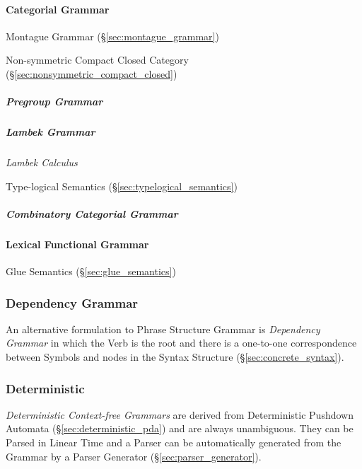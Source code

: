 \paragraph{Categorial Grammar}\label{sec:categorial_grammar}\hfill

Montague Grammar (\S\ref{sec:montague_grammar})

Non-symmetric Compact Closed Category
(\S\ref{sec:nonsymmetric_compact_closed})



\subparagraph{Pregroup Grammar}\label{sec:pregroup_grammar}\hfill

\subparagraph{Lambek Grammar}\label{sec:lambek_grammar}\hfill

\emph{Lambek Calculus}

Type-logical Semantics (\S\ref{sec:typelogical_semantics})


\subparagraph{Combinatory Categorial Grammar}\hfill
\label{sec:combinatory_categorial}



\paragraph{Lexical Functional Grammar}\label{sec:lexical_functional}
\hfill

Glue Semantics (\S\ref{sec:glue_semantics})



\subsubsection{Dependency Grammar}\label{sec:dependency_grammar}

An alternative formulation to Phrase Structure Grammar is
\emph{Dependency Grammar} in which the Verb is the root and there is a
one-to-one correspondence between Symbols and nodes in the Syntax
Structure (\S\ref{sec:concrete_syntax}).



\subsubsection{Deterministic}\label{sec:deterministic_cfg}

\emph{Deterministic Context-free Grammars} are derived from
Deterministic Pushdown Automata (\S\ref{sec:deterministic_pda}) and
are always unambiguous. They can be Parsed in Linear Time and a Parser
can be automatically generated from the Grammar by a Parser Generator
(\S\ref{sec:parser_generator}).



